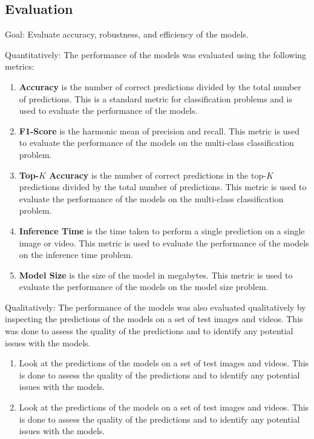 \documentclass{article}
\begin{document}

  \subsection{Evaluation} %
  \label{sub:evaluation}

  Goal: Evaluate accuracy, robustness, and efficiency of the models.

  Quantitatively: 
  The performance of the models was evaluated using the following metrics:

  \begin{enumerate}
    \item \textbf{Accuracy} is the number of correct predictions divided by the
      total number of predictions. This is a standard metric for classification
      problems and is used to evaluate the performance of the models.
    \item \textbf{F1-Score} is the harmonic mean of precision and recall. This
      metric is used to evaluate the performance of the models on the
      multi-class classification problem.
    \item \textbf{Top-$K$ Accuracy} is the number of correct predictions in the
      top-$K$ predictions divided by the total number of predictions. This
      metric is used to evaluate the performance of the models on the
      multi-class classification problem.
    \item \textbf{Inference Time} is the time taken to perform a single
      prediction on a single image or video. This metric is used to evaluate the
      performance of the models on the inference time problem.
    \item \textbf{Model Size} is the size of the model in megabytes. This metric
      is used to evaluate the performance of the models on the model size
      problem.
  \end{enumerate}

  Qualitatively: 
  The performance of the models was also evaluated qualitatively by inspecting
  the predictions of the models on a set of test images and videos. This was
  done to assess the quality of the predictions and to identify any potential
  issues with the models.

  \begin{enumerate}
    \item Look at the predictions of the models on a set of test images and
      videos. This is done to assess the quality of the predictions and to
      identify any potential issues with the models.
    \item Look at the predictions of the models on a set of test images and
      videos. This is done to assess the quality of the predictions and to
      identify any potential issues with the models.
  \end{enumerate}
\end{document}
